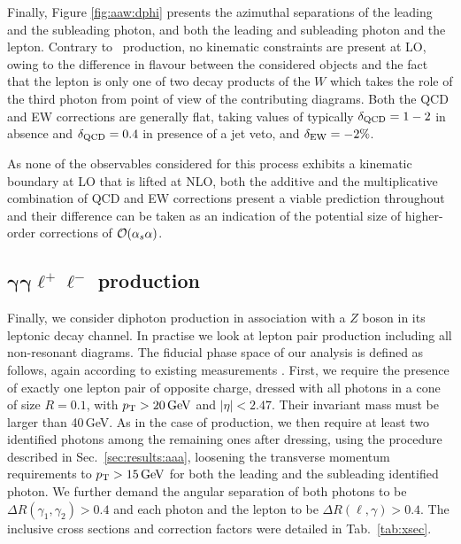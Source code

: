 Finally, Figure \ref{fig:aaw:dphi} presents the azimuthal 
separations of the leading and the subleading photon, and 
both the leading and subleading photon and the lepton. 
Contrary to \aaa\ production, no kinematic constraints 
are present at LO, owing to the difference in flavour 
between the considered objects and the fact that the 
lepton is only one of two decay products of the $W$ which 
takes the role of the third photon from point of view of 
the contributing diagrams. 
Both the QCD and EW corrections are generally flat, taking 
values of typically $\delta_\text{QCD}=1-2$ in absence and 
$\delta_\text{QCD}=0.4$ in presence of a jet veto, and 
$\delta_\text{EW}=-2\%$.


As none of the observables considered for this process 
exhibits a kinematic boundary at LO that is lifted at 
NLO, both the additive and the multiplicative combination 
of QCD and EW corrections present a viable prediction 
throughout and their difference can be taken as an 
indication of the potential size of higher-order corrections 
of $\mathcal{O}(\alpha_s\alpha)$.



\subsection[\texorpdfstring{$\gamma\gamma\ell^+\ell^-$}{aall} production]
           {$\boldsymbol{\gamma\gamma\ell^+\ell^-}$ production}
\label{sec:results:aaz}

Finally, we consider diphoton production in association with 
a $Z$ boson in its leptonic decay channel. 
In practise we look at lepton pair production including 
all non-resonant diagrams.
The fiducial phase space of our analysis is defined as follows, again according 
to existing measurements \cite{Aad:2016sau}. 
First, we require the presence of exactly one lepton pair 
of opposite charge, dressed with all photons in a cone of 
size $R=0.1$, with $p_\text{T}>20\,\text{GeV}$ and $|\eta|<2.47$. 
Their invariant mass must be larger than 40\,GeV. 
As in the case of \aaw production, we then require at least 
two identified photons among the remaining ones after dressing, 
using the procedure described in Sec.\ \ref{sec:results:aaa}, 
loosening the transverse momentum requirements to 
$p_\text{T}>15\,\text{GeV}$ for both the leading and the subleading 
identified photon. 
We further demand the angular separation of both photons 
to be $\Delta R(\gamma_1,\gamma_2)>0.4$ and each photon and 
the lepton to be $\Delta R(\ell,\gamma)>0.4$.
The inclusive cross sections and correction factors were 
detailed in Tab.\ \ref{tab:xsec}.

